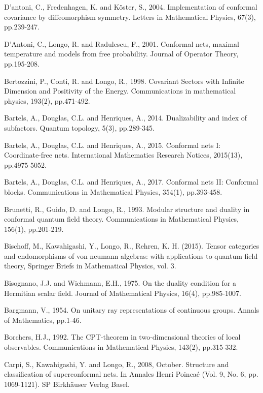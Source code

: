 \documentclass[12pt,a4paper]{article}
\theoremstyle{definition}
\theoremstyle{plain}
\numberwithin{equation}{section}
\begin{document}
\begin{thebibliography}{99999}
\footnotesize

D'antoni, C., Fredenhagen, K. and K\"oster, S., 2004. Implementation of conformal covariance by diffeomorphism symmetry. Letters in Mathematical Physics, 67(3), pp.239-247.

D'Antoni, C., Longo, R. and Radulescu, F., 2001. Conformal nets, maximal temperature and models from free probability. Journal of Operator Theory, pp.195-208.


Bertozzini, P., Conti, R. and Longo, R., 1998. Covariant Sectors with Infinite Dimension and Positivity of the Energy. Communications in mathematical physics, 193(2), pp.471-492.

Bartels, A., Douglas, C.L. and Henriques, A., 2014. Dualizability and index of subfactors. Quantum topology, 5(3), pp.289-345.

Bartels, A., Douglas, C.L. and Henriques, A., 2015. Conformal nets I: Coordinate-free nets. International Mathematics Research Notices, 2015(13), pp.4975-5052.

Bartels, A., Douglas, C.L. and Henriques, A., 2017. Conformal nets II: Conformal blocks. Communications in Mathematical Physics, 354(1), pp.393-458.

Brunetti, R., Guido, D. and Longo, R., 1993. Modular structure and duality in conformal quantum field theory. Communications in Mathematical Physics, 156(1), pp.201-219.

Bischoff, M., Kawahigashi, Y., Longo, R.,  Rehren, K. H. (2015). Tensor categories and endomorphisms of von neumann algebras: with applications to quantum field theory, Springer Briefs in Mathematical Physics, vol. 3.

Bisognano, J.J. and Wichmann, E.H., 1975. On the duality condition for a Hermitian scalar field. Journal of Mathematical Physics, 16(4), pp.985-1007.


Bargmann, V., 1954. On unitary ray representations of continuous groups. Annals of Mathematics, pp.1-46.

Borchers, H.J., 1992. The CPT-theorem in two-dimensional theories of local observables. Communications in Mathematical Physics, 143(2), pp.315-332.

Carpi, S., Kawahigashi, Y. and Longo, R., 2008, October. Structure and classification of superconformal nets. In Annales Henri Poinca\'e (Vol. 9, No. 6, pp. 1069-1121). SP Birkh\"auser Verlag Basel.


\end{thebibliography}
\end{document}
